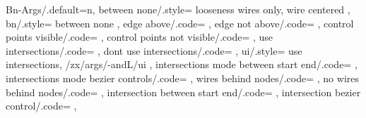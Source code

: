 {{    Bn-Args/.default={n}{},
    between none/.style={
      looseness wires only,
      wire centered
    },
    bn/.style={
      between none
    },
    edge above/.code={%
      \def\zxEdgesAbove{}%
    },%
    edge not above/.code={%
      \let\zxEdgesAbove\undefined%
    },
    control points visible/.code={%
      \def\zxControlPointsVisible{}%
    },%
    control points not visible/.code={%
      \let\zxControlPointsVisible\undefined%
    },
    use intersections/.code={%
      \def\zxEnableIntersectionsWires{}%
    },
    dont use intersections/.code={%
      \let\zxEnableIntersectionsWires\undefined%
    },
    ui/.style={
      use intersections,
      /zx/args/-andL/ui
    },
    intersections mode between start end/.code={%
      \def\zxIntersectionLineBetweenStartEnd{}%
    },
    intersections mode bezier controls/.code={%
      \let\zxIntersectionLineBetweenStartEnd\undefined%
    },
    wires behind nodes/.code={%
      \def\zxWireInsideIfNoIntersectionName{}%
    },
    no wires behind nodes/.code={%
      \let\zxWireInsideIfNoIntersectionName\undefined%
    },
    intersection between start end/.code={
      \def\zxIntersectionLineBetweenStartEnd{}%
    },
    intersection bezier control/.code={
      \let\zxIntersectionLineBetweenStartEnd\undefined%
    },
}}
